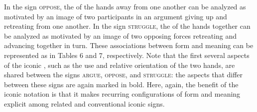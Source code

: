 \documentclass[output=paper,
modfonts
]{LSP/langsci}
\begin{document}
In the sign \textsc{oppose}, the  of the hands away from one another can be analyzed as motivated by an image of two participants in an argument giving up and retreating from one another. In the sign \textsc{struggle}, the  of the hands together can be analyzed as motivated by an image of two opposing forces retreating and advancing together in turn. These associations between form and meaning can be represented as in Tables 6 and 7, respectively. Note that the first several aspects of the iconic , such as the use and relative orientation of the two hands, are shared between the signs \textsc{argue}, \textsc{oppose}, and \textsc{struggle}: the aspects that differ between these signs are again marked in bold. Here, again, the benefit of the iconic  notation is that it makes recurring configurations of form and meaning explicit among related and conventional iconic signs.

\begin{table}
\caption{Aspects of the iconic  for \textsc{oppose}.}
\label{tab:6lp}
\end{table}
\end{document}
